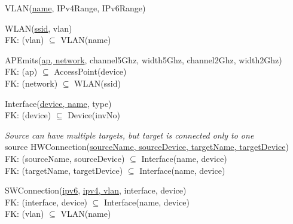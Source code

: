 \documentclass[a4paper,10pt]{article}
\begin{document}
VLAN(\underline{name}, IPv4Range, IPv6Range)

WLAN(\underline{ssid}, vlan)\\
\hspace*{1em}FK: (vlan) \(\subseteq\) VLAN(name)

APEmits(\underline{ap, network}, channel5Ghz, width5Ghz, channel2Ghz, width2Ghz)\\
\hspace*{1em}FK: (ap) \(\subseteq\) AccessPoint(device)\\
\hspace*{1em}FK: (network) \(\subseteq\) WLAN(ssid)

Interface(\underline{device, name}, type)\\
\hspace*{1em}FK: (device) \(\subseteq\) Device(invNo)

\textit{Source can have multiple targets, but target is connected only to one}\\
source HWConnection(\underline{sourceName, sourceDevice, targetName, targetDevice})\\
\hspace*{1em}FK: (sourceName, sourceDevice) \(\subseteq\) Interface(name, device)\\
\hspace*{1em}FK: (targetName, targetDevice) \(\subseteq\) Interface(name, device)

SWConnection(\underline{ipv6}, \underline{ipv4, vlan}, interface, device)\\
\hspace*{1em}FK: (interface, device) \(\subseteq\) Interface(name, device)\\
\hspace*{1em}FK: (vlan) \(\subseteq\) VLAN(name)
\end{document}
